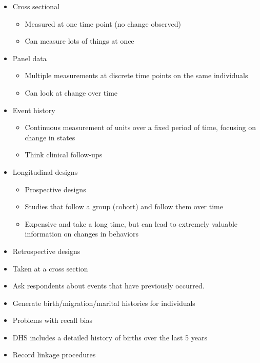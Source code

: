 \documentclass[
]{article}
\providecommand{\tightlist}{%
  \setlength{\itemsep}{0pt}\setlength{\parskip}{0pt}}
\begin{document}
\begin{itemize}
\item
  Cross sectional

  \begin{itemize}
  \tightlist
  \item
    Measured at one time point (no change observed)
  \item
    Can measure lots of things at once
  \end{itemize}
\item
  Panel data

  \begin{itemize}
  \tightlist
  \item
    Multiple measurements at discrete time points on the same individuals
  \item
    Can look at change over time
  \end{itemize}
\item
  Event history

  \begin{itemize}
  \tightlist
  \item
    Continuous measurement of units over a fixed period of time, focusing on change in states
  \item
    Think clinical follow-ups
  \end{itemize}
\item
  Longitudinal designs

  \begin{itemize}
  \tightlist
  \item
    Prospective designs
  \item
    Studies that follow a group (cohort) and follow them over time
  \item
    Expensive and take a long time, but can lead to extremely valuable information on changes in behaviors
  \end{itemize}
\item
  Retrospective designs
\item
  Taken at a cross section
\item
  Ask respondents about events that have previously occurred.
\item
  Generate birth/migration/marital histories for individuals
\item
  Problems with recall bias
\item
  DHS includes a detailed history of births over the last 5 years
\item
  Record linkage procedures


\end{itemize}
\end{document}
